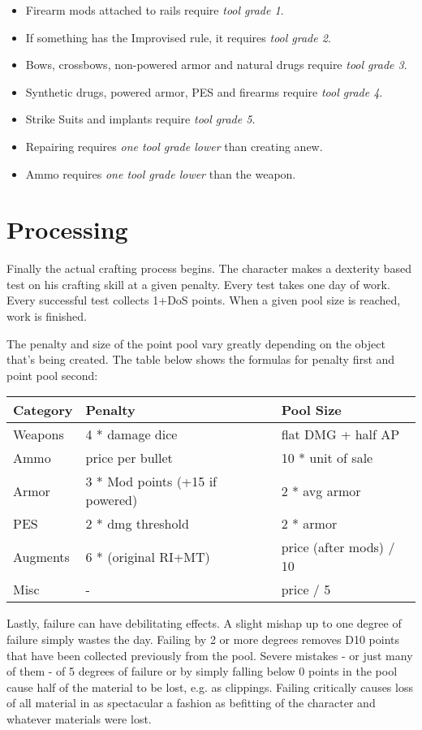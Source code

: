 \documentclass[12pt,a4paper,openany]{book}
\begin{document}
	\begin{itemize}
		\item Firearm mods attached to rails require \emph{tool grade 1}.
		\item If something has the Improvised rule, it requires \emph{tool grade 2}.
		\item Bows, crossbows, non-powered armor and natural drugs require \emph{tool grade 3}.
		\item Synthetic drugs, powered armor, PES and firearms require \emph{tool grade 4}.
		\item Strike Suits and implants require \emph{tool grade 5}.
		\item Repairing requires \emph{one tool grade lower} than creating anew.
		\item Ammo requires \emph{one tool grade lower} than the weapon.
	\end{itemize}

	\chapter{Processing}
	Finally the actual crafting process begins. The character makes a dexterity based test on his crafting skill at a given penalty. Every test takes one day of work. Every successful test collects 1+DoS points. When a given pool size is reached, work is finished.\par
	The penalty and size of the point pool vary greatly depending on the object that’s being created. The table below shows the formulas for penalty first and point pool second:
	\par
	\begin{tabularx}{\columnwidth}{X|ll}
		Category & Penalty & Pool Size \\ \hline
		Weapons & 4 * damage dice & flat DMG + half AP \\
		Ammo & price per bullet & 10 * unit of sale \\
		Armor & 3 * Mod points (+15 if powered) & 2 * avg armor \\
		PES & 2 * dmg threshold & 2 * armor \\
		Augments & 6 * (original RI+MT) & price (after mods) / 10 \\ %
		Misc & - & price / 5
	\end{tabularx}\par
	Lastly, failure can have debilitating effects. A slight mishap up to one degree of failure simply wastes the day. Failing by 2 or more degrees removes D10 points that have been collected previously from the pool. Severe mistakes - or just many of them - of 5 degrees of failure or by simply falling below 0 points in the pool cause half of the material to be lost, e.g. as clippings. Failing critically causes loss of all material in as spectacular a fashion as befitting of the character and whatever materials were lost.
\end{document}
